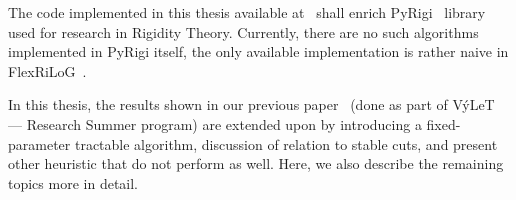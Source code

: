 The code implemented in this thesis available at~\cite{my_code}
shall enrich PyRigi~\cite{pyrigi}
library used for research in Rigidity Theory.
Currently, there are no such algorithms implemented in PyRigi itself,
the only available implementation is rather naive in FlexRiLoG~\cite{flexrilog}.

In this thesis, the results shown in our previous paper~\cite{my_paper}
(done as part of VýLeT --- Research Summer program)
are extended upon by introducing a fixed-parameter tractable algorithm,
discussion of relation to stable cuts,
and present other heuristic that do not perform as well.
Here, we also describe the remaining topics more in detail.

